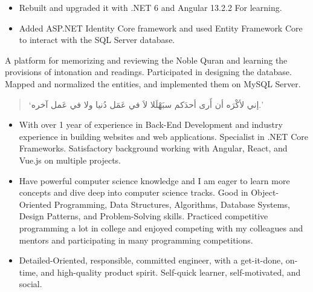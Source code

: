 \documentclass[10pt,a4paper,ragged2e,withhyper]{altacv}
\begin{document}
\begin{paracol}{2}
\divider

\begin{itemize}
\item Rebuilt and upgraded it with .NET 6 and Angular 13.2.2 For learning.
\item Added ASP.NET Identity Core framework and used Entity Framework Core to interact with the SQL Server database.
\end{itemize}

\divider

A platform for memorizing and reviewing the Noble Quran and learning the provisions of intonation and readings. Participated in designing the database. Mapped and normalized the entities, and implemented them on MySQL Server.

\medskip


\switchcolumn


\begin{quote}
\begin{RLtext}
`إني لأكْرَه أن أَرى أحدَكم سبَهْلَلا لاَ في عَمَل دُنيا ولا في عَمل آخره.'
\end{RLtext}
\end{quote}


\begin{itemize}
\item With over 1 year of experience in Back-End Development and industry experience in building websites and web applications. Specialist in .NET Core Frameworks. Satisfactory background working with Angular, React, and Vue.js on multiple projects.
\item Have powerful computer science knowledge and I am eager to learn more concepts and dive deep into computer science tracks. Good in Object-Oriented Programming, Data Structures, Algorithms, Database Systems, Design Patterns, and Problem-Solving skills. Practiced competitive programming a lot in college and enjoyed competing with my colleagues and mentors and participating in many programming competitions.
\item Detailed-Oriented, responsible, committed engineer, with a get-it-done, on-time, and high-quality product spirit. Self-quick learner, self-motivated, and social.
\end{itemize}


\end{paracol}
\end{document}
